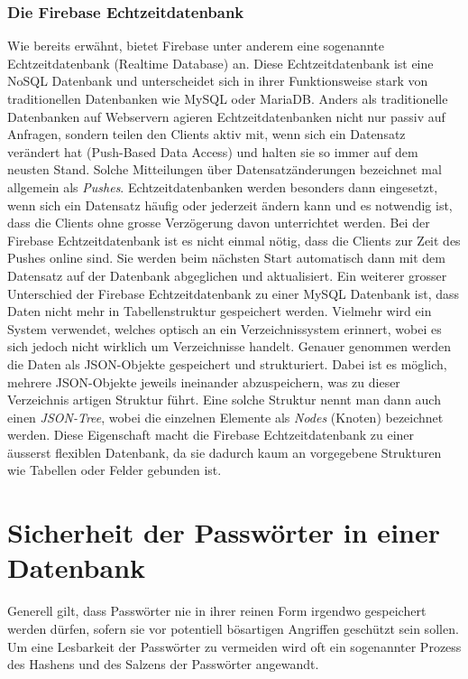 \documentclass[../main.tex]{subfiles}
\begin{document}
	\subsubsection{Die Firebase Echtzeitdatenbank} \label{firebaseRealtime}
	Wie bereits erwähnt, bietet Firebase unter anderem eine sogenannte Echtzeitdatenbank (Realtime Database) an. Diese Echtzeitdatenbank ist eine NoSQL Datenbank und unterscheidet sich in ihrer Funktionsweise stark von traditionellen Datenbanken wie MySQL oder MariaDB. Anders als traditionelle Datenbanken auf Webservern agieren Echtzeitdatenbanken nicht nur passiv auf Anfragen, sondern teilen den Clients aktiv mit, wenn sich ein Datensatz verändert hat (Push-Based Data Access) und halten sie so immer auf dem neusten Stand. Solche Mitteilungen über Datensatzänderungen bezeichnet mal allgemein als \emph{Pushes}. Echtzeitdatenbanken werden besonders dann eingesetzt, wenn sich ein Datensatz häufig oder jederzeit ändern kann und es notwendig ist, dass die Clients ohne grosse Verzögerung davon unterrichtet werden. \cite{RealtimeDatabase} Bei der Firebase Echtzeitdatenbank ist es nicht einmal nötig, dass die Clients zur Zeit des Pushes online sind. Sie werden beim nächsten Start automatisch dann mit dem Datensatz auf der Datenbank abgeglichen und aktualisiert. Ein weiterer grosser Unterschied der Firebase Echtzeitdatenbank zu einer MySQL Datenbank ist, dass Daten nicht mehr in Tabellenstruktur gespeichert werden. Vielmehr wird ein System verwendet, welches optisch an ein Verzeichnissystem erinnert, wobei es sich jedoch nicht wirklich um Verzeichnisse handelt. Genauer genommen werden die Daten als JSON-Objekte gespeichert und strukturiert. Dabei ist es möglich, mehrere JSON-Objekte jeweils ineinander abzuspeichern, was zu dieser Verzeichnis artigen Struktur führt. Eine solche Struktur nennt man dann auch einen \emph{JSON-Tree}, wobei die einzelnen Elemente als \emph{Nodes} (Knoten) bezeichnet werden. Diese Eigenschaft macht die Firebase Echtzeitdatenbank zu einer äusserst flexiblen Datenbank, da sie dadurch kaum an vorgegebene Strukturen wie Tabellen oder Felder gebunden ist. \cite{firebaseStructure}\cite{FirebaseRTDB}
	
	
	\section{Sicherheit der Passwörter in einer Datenbank}
	Generell gilt, dass Passwörter nie in ihrer reinen Form irgendwo gespeichert werden dürfen, sofern sie vor potentiell bösartigen Angriffen geschützt sein sollen. Um eine Lesbarkeit der Passwörter zu vermeiden wird oft ein sogenannter Prozess des Hashens und des Salzens der Passwörter angewandt. 
	
\end{document}
